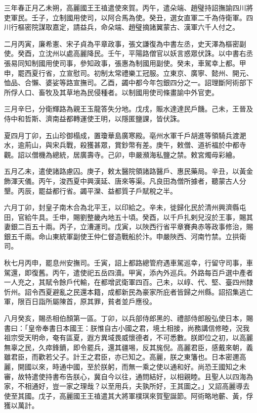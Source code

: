 \begin{pinyinscope}
 三年春正月乙未朔，高麗國王王禃遣使來賀。丙午，遣朵端、趙璧持詔撫諭四川將吏軍民。壬子，立制國用使司，以阿合馬為使。癸丑，選女直軍二千為侍衛軍。四川行樞密院謀取嘉定，請益兵，命朵端、趙璧摘諸翼蒙古、漢軍六千人付之。



 二月丙寅，廉希憲、宋子貞為平章政事，張文謙復為中書左丞，史天澤為樞密副使。癸酉，立沈州以處高麗降民。壬午，平陽路僧官以妖言惑眾伏誅。以中書右丞張易同知制國用使司事，參知政事，張惠為制國用副使。癸未，車駕幸上都。甲申，罷西夏行省，立宣慰司。初制太常禮樂工冠服。立東京、廣寧、懿州、開元、恤品、合懶、婆娑等路宣撫司。乙酉，蠲中都今年包銀四分之一。詔理斷阿術部下所俘人口、畜牧及其草地為民侵種者。以制國用使司條畫諭中外官吏。



 三月辛巳，分衛輝路為親王玉龍答失分地。戊戌，賑水達達民戶饑。己未，王晉及侍中和哲斯、濟南益都轉運使王明，以隱匿鹽課，皆伏誅。



 夏四月丁卯，五山珍御榻成，置瓊華島廣寒殿。亳州水軍千戶胡進等領騎兵渡淝水，逾荊山，與宋兵戰，殺獲甚眾，賞鈔幣有差。庚午，敕僧、道祈福於中都寺觀。詔以僧機為總統，居廣壽寺。己卯，申嚴瀕海私鹽之禁。敕宮燭毋彩繪。



 五月乙未，遣使諸路慮囚。庚子，敕太醫院領諸路醫戶、惠民藥局。辛丑，以黃金飾渾天儀。丙午，浚西夏中興漢延、唐來等渠。凡良田為僧所據者，聽蒙古人分墾。丙辰，罷益都行省。蠲平灤、益都質子戶賦稅之半。



 六月丁卯，封皇子南木合為北平王，以印給之。辛未，徙歸化民於清州興濟縣屯田，官給牛具。壬申，賜劉整畿內地五十頃。癸酉，以千戶扎剌兒沒於王事，賜其妻銀二百五十兩。丙子，立漕運司。戊寅，以陜西行省平章賽典赤等政事修治，賜銀五千兩。命山東統軍副使王仲仁督造戰船於汴。申嚴陜西、河南竹禁。立拱衛司。



 秋七月丙申，罷息州安撫司。壬寅，詔上都路總管府遇車駕巡幸，行留守司事，車駕還，即復舊。丙午，遣使祀五岳四瀆。甲寅，添內外巡兵。外路每百戶選中產者一人充之，其賦令餘戶代輸，在都增武衛軍四百。己未，以崞、代、堅、臺四州隸忻州。詔令西夏避亂之民還本籍，成都新民為豪家所庇者皆歸之州縣。詔招集逃亡軍，限百日詣所屬陳首，原其罪，貧者並戶應役。



 八月癸亥，賜丞相伯顏第一區。丁卯，以兵部侍郎黑的、禮部侍郎殷弘使日本，賜書曰：「皇帝奉書日本國王：朕惟自古小國之君，境土相接，尚務講信修睦，況我祖宗受天明命，奄有區夏，遐方異域畏威懷德者，不可悉數。朕即位之初，以高麗無辜之民，久瘁鋒鏑，即令罷兵，還其疆埸，反其旄倪。高麗君臣，感戴來朝，義雖君臣，而歡若父子。計王之君臣，亦已知之。高麗，朕之東籓也。日本密邇高麗，開國以來，時通中國，至於朕躬，而無一乘之使以通和好。尚恐王國知之未審，故特遣使持書布告朕心，冀自今以往，通問結好，以相親睦。且聖人以四海為家，不相通好，豈一家之理哉？以至用兵，夫孰所好，王其圖之。」又詔高麗導去使至其國。戊子，高麗國王王禃遣其大將軍樸琪來賀聖誕節。阿術略地蘄、黃，俘獲以萬計。




\end{pinyinscope}
